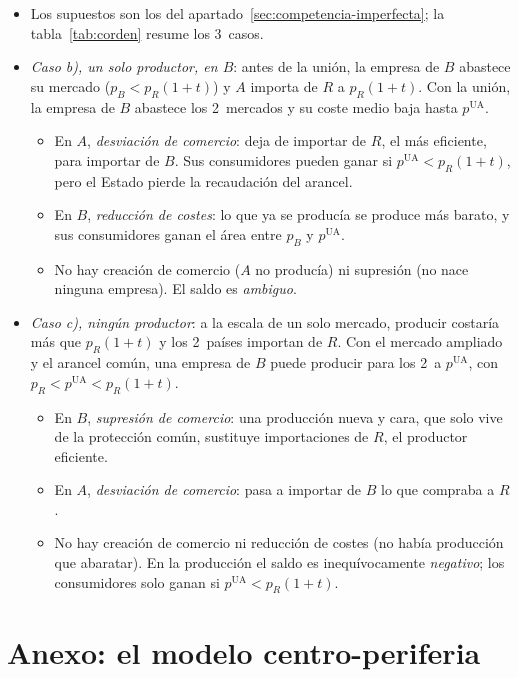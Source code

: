 \documentclass[11pt]{article}
\begin{document}
\begin{itemize}
\item Los supuestos son los del apartado~\ref{sec:competencia-imperfecta}; la tabla~\ref{tab:corden} resume los 3~casos.
\item \emph{Caso b), un solo productor, en $B$}: antes de la unión, la empresa de $B$ abastece su mercado ($p_B<p_R(1+t)$) y $A$ importa de $R$ a $p_R(1+t)$. Con la unión, la empresa de $B$ abastece los 2~mercados y su coste medio baja hasta $p^{\mathrm{UA}}$.
  \begin{itemize}
  \item En $A$, \emph{desviación de comercio}: deja de importar de $R$, el más eficiente, para importar de $B$. Sus consumidores pueden ganar si $p^{\mathrm{UA}}<p_R(1+t)$, pero el Estado pierde la recaudación del arancel.
  \item En $B$, \emph{reducción de costes}: lo que ya se producía se produce más barato, y sus consumidores ganan el área entre $p_B$ y $p^{\mathrm{UA}}$.
  \item No hay creación de comercio ($A$ no producía) ni supresión (no nace ninguna empresa). El saldo es \emph{ambiguo}.
  \end{itemize}
\item \emph{Caso c), ningún productor}: a la escala de un solo mercado, producir costaría más que $p_R(1+t)$ y los 2~países importan de $R$. Con el mercado ampliado y el arancel común, una empresa de $B$ puede producir para los 2~a $p^{\mathrm{UA}}$, con $p_R<p^{\mathrm{UA}}<p_R(1+t)$.
  \begin{itemize}
  \item En $B$, \emph{supresión de comercio}: una producción nueva y cara, que solo vive de la protección común, sustituye importaciones de $R$, el productor eficiente.
  \item En $A$, \emph{desviación de comercio}: pasa a importar de $B$ lo que compraba a $R$.
  \item No hay creación de comercio ni reducción de costes (no había producción que abaratar). En la producción el saldo es inequívocamente \emph{negativo}; los consumidores solo ganan si $p^{\mathrm{UA}}<p_R(1+t)$.
  \end{itemize}
\end{itemize}

\section{Anexo: el modelo centro-periferia}\label{anexo:centro-periferia}
\end{document}
